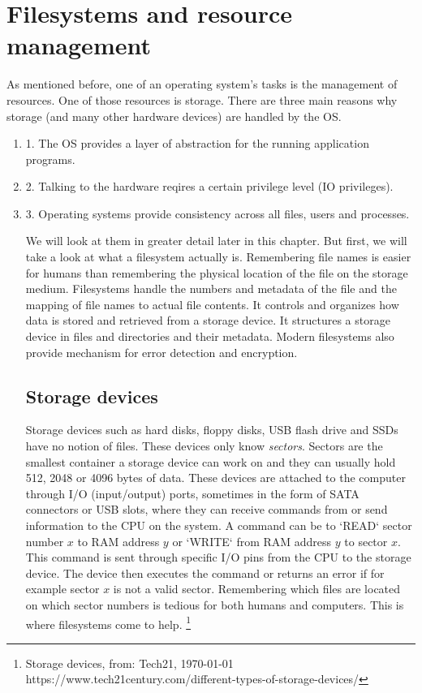 \section{Filesystems and resource management}

As mentioned before, one of an operating system's tasks is the management of resources.
One of those resources is storage. There are three main reasons why storage (and many other
hardware devices) are handled by the OS.
\begin{enumerate}
\item 1. The OS provides a layer of abstraction for the running application programs. 
\item 2. Talking to the hardware reqires a certain privilege level (IO privileges).
\item 3. Operating systems provide consistency across all files, users and processes.

We will look at them in greater detail later in this chapter.
But first, we will take a look at what a filesystem actually is. Remembering file names is easier for
humans than remembering the physical location of the file on the storage medium. Filesystems handle
the numbers and metadata of the file and the mapping of file names to actual file contents. It
controls and organizes how data is stored and retrieved from a storage device. It structures a storage
device in files and directories and their metadata. Modern filesystems also provide mechanism for
error detection and encryption.

\subsection{Storage devices}

Storage devices such as hard disks, floppy disks, USB flash drive and SSDs have no notion of files.
These devices only know \textit{sectors}. Sectors are the smallest container a storage device
can work on and they can usually hold 512, 2048 or 4096 bytes of data. These devices are attached to
the computer through I/O (input/output) ports, sometimes in the form of SATA connectors or USB slots, where they can
receive commands from or send information to the CPU on the system. A command can be to `READ` sector number $x$ to RAM
address $y$ or `WRITE` from RAM address $y$ to sector $x$. This command is sent through
specific I/O pins from the CPU to the storage device. The device then executes the command or returns
an error if for example sector $x$ is not a valid sector. Remembering which files are located on
which sector numbers is tedious for both humans and computers. This is where filesystems come to help.
\footnote{Storage devices, from: Tech21, \today  \\ https://www.tech21century.com/different-types-of-storage-devices/}


\end{enumerate}

